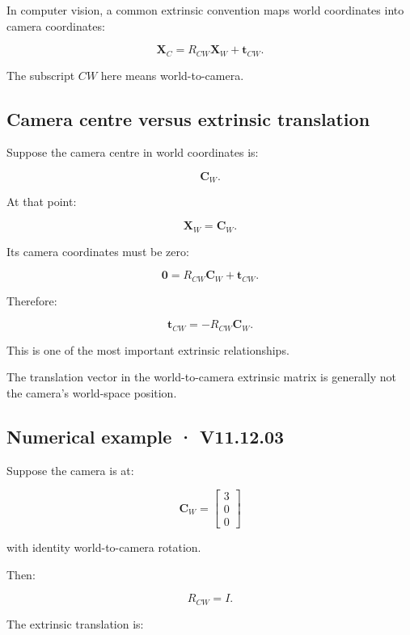 In computer vision, a common extrinsic convention maps world coordinates into camera coordinates:

\[
 \boxed{ \mathbf X_C=R_{CW}\mathbf X_W+\mathbf t_{CW} }.
\]

The subscript \(CW\) here means world-to-camera.

\subsection{Camera centre versus extrinsic translation}\label{02-foundations-ii-ch035-camera-centre-versus-extrinsic-translation}

\hypertarget{02-foundations-ii-ch035-camera-centre-versus-extrinsic-translation}{}

Suppose the camera centre in world coordinates is:

\[
 \mathbf C_W.
\]

At that point:

\[
 \mathbf X_W=\mathbf C_W.
\]

Its camera coordinates must be zero:

\[
 \mathbf0=R_{CW}\mathbf C_W+\mathbf t_{CW}.
\]

Therefore:

\[
 \boxed{ \mathbf t_{CW}=-R_{CW}\mathbf C_W }.
\]

This is one of the most important extrinsic relationships.

The translation vector in the world-to-camera extrinsic matrix is generally not the camera's world-space position.

\subsection{Numerical example · V11.12.03}\label{02-foundations-ii-ch035-numerical-example-v11.12.03}

\hypertarget{02-foundations-ii-ch035-numerical-example-v11.12.03}{}

Suppose the camera is at:

\[
 \mathbf C_W= \begin{bmatrix}3\\0\\0\end{bmatrix}
\]

with identity world-to-camera rotation.

Then:

\[
 R_{CW}=I.
\]

The extrinsic translation is:

